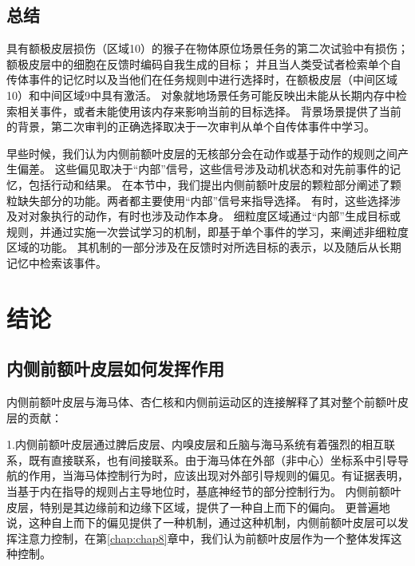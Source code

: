 \subsection{总结}

具有额极皮层损伤（区域10）的猴子在物体原位场景任务的第二次试验中有损伤；
额极皮层中的细胞在反馈时编码自我生成的目标；
并且当人类受试者检索单个自传体事件的记忆时以及当他们在任务规则中进行选择时，在额极皮层（中间区域10）和中间区域9中具有激活。
对象就地场景任务可能反映出未能从长期内存中检索相关事件，或者未能使用该内存来影响当前的目标选择。
背景场景提供了当前的背景，第二次审判的正确选择取决于一次审判从单个自传体事件中学习。\par


早些时候，我们认为内侧前额叶皮层的无核部分会在动作或基于动作的规则之间产生偏差。
这些偏见取决于“内部”信号，这些信号涉及动机状态和对先前事件的记忆，包括行动和结果。
在本节中，我们提出内侧前额叶皮层的颗粒部分阐述了颗粒缺失部分的功能。两者都主要使用“内部”信号来指导选择。
有时，这些选择涉及对对象执行的动作，有时也涉及动作本身。
细粒度区域通过“内部”生成目标或规则，并通过实施一次尝试学习的机制，即基于单个事件的学习，来阐述非细粒度区域的功能。
其机制的一部分涉及在反馈时对所选目标的表示，以及随后从长期记忆中检索该事件。\par



\section{结论}

\subsection{内侧前额叶皮层如何发挥作用}

内侧前额叶皮层与海马体、杏仁核和内侧前运动区的连接解释了其对整个前额叶皮层的贡献：\par

1.内侧前额叶皮层通过脾后皮层、内嗅皮层和丘脑与海马系统有着强烈的相互联系，既有直接联系，也有间接联系。由于海马体在外部（非中心）坐标系中引导导航的作用，当海马体控制行为时，应该出现对外部引导规则的偏见。有证据表明，当基于内在指导的规则占主导地位时，基底神经节的部分控制行为\cite{packard1996inactivation}。
内侧前额叶皮层，特别是其边缘前和边缘下区域，提供了一种自上而下的偏向。
更普遍地说，这种自上而下的偏见提供了一种机制，通过这种机制，内侧前额叶皮层可以发挥注意力控制，在第\ref{chap:chap8}章中，我们认为前额叶皮层作为一个整体发挥这种控制。\par


